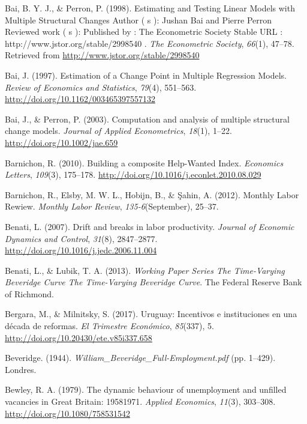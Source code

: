 \documentclass[12pt,oneside]{reedthesis}
\begin{document}
\leavevmode\hypertarget{ref-BaiPerron1998}{}%
Bai, B. Y. J., \& Perron, P. (1998). Estimating and Testing Linear Models with Multiple Structural Changes Author ( s ): Jushan Bai and Pierre Perron Reviewed work ( s ): Published by : The Econometric Society Stable URL : http://www.jstor.org/stable/2998540 . \emph{The Econometric Society}, \emph{66}(1), 47--78. Retrieved from \url{http://www.jstor.org/stable/2998540}

\leavevmode\hypertarget{ref-Bai1997}{}%
Bai, J. (1997). Estimation of a Change Point in Multiple Regression Models. \emph{Review of Economics and Statistics}, \emph{79}(4), 551--563. \url{http://doi.org/10.1162/003465397557132}

\leavevmode\hypertarget{ref-BaiPerron2003}{}%
Bai, J., \& Perron, P. (2003). Computation and analysis of multiple structural change models. \emph{Journal of Applied Econometrics}, \emph{18}(1), 1--22. \url{http://doi.org/10.1002/jae.659}

\leavevmode\hypertarget{ref-Barnichon2010}{}%
Barnichon, R. (2010). Building a composite Help-Wanted Index. \emph{Economics Letters}, \emph{109}(3), 175--178. \url{http://doi.org/10.1016/j.econlet.2010.08.029}

\leavevmode\hypertarget{ref-Barnichon2012}{}%
Barnichon, R., Elsby, M. W. L., Hobijn, B., \& Şahin, A. (2012). Monthly Labor Rewiew. \emph{Monthly Labor Review}, \emph{135-6}(September), 25--37.

\leavevmode\hypertarget{ref-Benati2007}{}%
Benati, L. (2007). Drift and breaks in labor productivity. \emph{Journal of Economic Dynamics and Control}, \emph{31}(8), 2847--2877. \url{http://doi.org/10.1016/j.jedc.2006.11.004}

\leavevmode\hypertarget{ref-Benati2013}{}%
Benati, L., \& Lubik, T. A. (2013). \emph{Working Paper Series The Time-Varying Beveridge Curve The Time-Varying Beveridge Curve}. The Federal Reserve Bank of Richmond.

\leavevmode\hypertarget{ref-Bergara2017}{}%
Bergara, M., \& Milnitsky, S. (2017). Uruguay: Incentivos e instituciones en una década de reformas. \emph{El Trimestre Económico}, \emph{85}(337), 5. \url{http://doi.org/10.20430/ete.v85i337.658}

\leavevmode\hypertarget{ref-Beveridge}{}%
Beveridge. (1944). \emph{William\_Beveridge\_Full-Employment.pdf} (pp. 1--429). Londres.

\leavevmode\hypertarget{ref-Bewley1979}{}%
Bewley, R. A. (1979). The dynamic behaviour of unemployment and unfilled vacancies in Great Britain: 19581971. \emph{Applied Economics}, \emph{11}(3), 303--308. \url{http://doi.org/10.1080/758531542}
\end{document}
